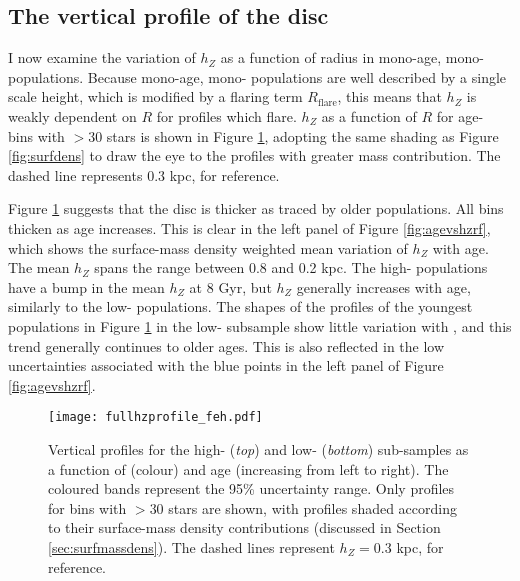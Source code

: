 \subsection{The vertical profile of the disc}
I now examine the variation of $h_Z$ as a function of radius in mono-age, mono-\feh{} populations. Because mono-age, mono-\feh{} populations are well described by a single scale height, which is modified by a flaring term $R_{\text{flare}}$, this means that $h_Z$ is weakly dependent on $R$ for profiles which flare. $h_Z$ as a function of $R$ for age-\feh{} bins with $> 30$ stars is shown in Figure \ref{fig:hzprofile}, adopting the same shading as Figure \ref{fig:surfdens} to draw the eye to the profiles with greater mass contribution. The dashed line represents $0.3$ kpc, for reference.

Figure \ref{fig:hzprofile} suggests that the disc is thicker as traced by older populations. All \feh{} bins thicken as age increases. This is clear in the left panel of Figure \ref{fig:agevshzrf}, which shows the surface-mass density weighted mean variation of $h_Z$ with age. The mean $h_Z$ spans the range between 0.8 and 0.2 kpc. The high-\afe{} populations have  a bump in the mean $h_Z$ at 8 Gyr, but $h_Z$ generally increases with age, similarly to the low-\afe{} populations. The shapes of the profiles of the youngest populations in Figure \ref{fig:hzprofile} in the low-\afe{} subsample show little variation with \feh{}, and this trend generally continues to older ages. This is also reflected in the low uncertainties associated with the blue points in the left panel of Figure \ref{fig:agevshzrf}. 


\begin{landscape}
 \begin{figure}
 	\texttt{[image: fullhzprofile\_feh.pdf]}
 	\centering
     \caption[Radial scale height profiles of mono-age, mono-\feh{} populations in the low and high-\afe{} disc components]{Vertical profiles for the high-\afe{} (\emph{top}) and low-\afe{} (\emph{bottom}) sub-samples as a function of \feh{} (colour) and age (increasing from left to right). The coloured bands represent the 95\% uncertainty range. Only profiles for bins with $> 30$ stars are shown, with profiles shaded according to their surface-mass density contributions (discussed in Section \ref{sec:surfmassdens}).  The dashed lines represent $h_Z = 0.3$ kpc, for reference.}
     \label{fig:hzprofile}
 \end{figure}
\end{landscape}


